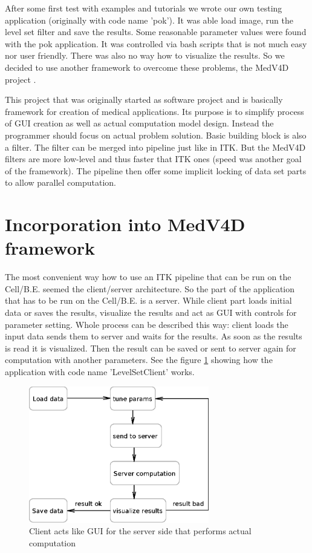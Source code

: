 \par
After some first test with examples and tutorials we wrote our own testing application (originally with code name 'pok').
It was able load image, run the level set filter and save the results.
Some reasonable parameter values were found with the pok application.
It was controlled via bash scripts that is not much easy nor user friendly.
There was also no way how to visualize the results.
So we decided to use another framework to overcome these problems, the MedV4D project \cite{medved}.

\par
This project that was originally started as software project and is basically framework for creation of medical applications.
Its purpose is to simplify process of GUI creation as well as actual computation model design.
Instead the programmer should focus on actual problem solution.
Basic building block is also a filter.
The filter can be merged into pipeline just like in ITK.
But the MedV4D filters are more low-level and thus faster that ITK ones (speed was another goal of the framework).
The pipeline then offer some implicit locking of data set parts to allow parallel computation.

\section{Incorporation into MedV4D framework}

\par
The most convenient way how to use an ITK pipeline that can be run on the Cell/B.E. seemed the client/server architecture.
So the part of the application that has to be run on the Cell/B.E. is a server.
While client part loads initial data or saves the results, visualize the results and act as GUI with controls for parameter setting.
Whole process can be described this way: client loads the input data sends them to server and waits for the results.
As soon as the results is read it is visualized.
Then the result can be saved or sent to server again for computation with another parameters.
See the figure \ref{fg:computationProcess} showing how the application with code name 'LevelSetClient' works.

\begin{figure}
    \centering
    \includegraphics[width=0.7\textwidth]{data/computationProcess}
    \caption[LevelSetClient application computation process]{Client acts like GUI for the server side that performs actual computation}
    \label{fg:computationProcess}
\end{figure}

